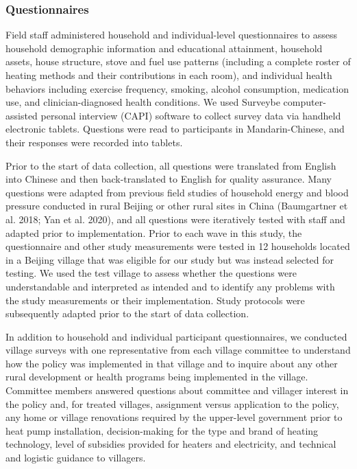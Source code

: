 \documentclass[
  letterpaper,
  DIV=11,
  numbers=noendperiod]{scrartcl}
\begin{document}
\subsubsection{Questionnaires}\label{questionnaires}

Field staff administered household and individual-level questionnaires
to assess household demographic information and educational attainment,
household assets, house structure, stove and fuel use patterns
(including a complete roster of heating methods and their contributions
in each room), and individual health behaviors including exercise
frequency, smoking, alcohol consumption, medication use, and
clinician-diagnosed health conditions. We used Surveybe
computer-assisted personal interview (CAPI) software to collect survey
data via handheld electronic tablets. Questions were read to
participants in Mandarin-Chinese, and their responses were recorded into
tablets.

Prior to the start of data collection, all questions were translated
from English into Chinese and then back-translated to English for
quality assurance. Many questions were adapted from previous field
studies of household energy and blood pressure conducted in rural
Beijing or other rural sites in China (Baumgartner et al. 2018; Yan et
al. 2020), and all questions were iteratively tested with staff and
adapted prior to implementation. Prior to each wave in this study, the
questionnaire and other study measurements were tested in 12 households
located in a Beijing village that was eligible for our study but was
instead selected for testing. We used the test village to assess whether
the questions were understandable and interpreted as intended and to
identify any problems with the study measurements or their
implementation. Study protocols were subsequently adapted prior to the
start of data collection.

In addition to household and individual participant questionnaires, we
conducted village surveys with one representative from each village
committee to understand how the policy was implemented in that village
and to inquire about any other rural development or health programs
being implemented in the village. Committee members answered questions
about committee and villager interest in the policy and, for treated
villages, assignment versus application to the policy, any home or
village renovations required by the upper-level government prior to heat
pump installation, decision-making for the type and brand of heating
technology, level of subsidies provided for heaters and electricity, and
technical and logistic guidance to villagers.
\end{document}
